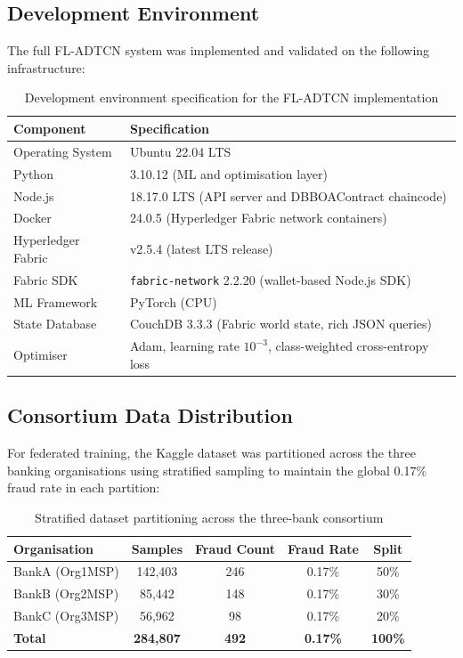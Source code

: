 \subsection*{Development Environment}

The full FL-ADTCN system was implemented and validated on the following infrastructure:

\begin{table}[H]
\centering
\caption{Development environment specification for the FL-ADTCN implementation}
\label{tab:dev_env}
\begin{tabular}{|p{4.0cm}|p{9.9cm}|}
\hline
\textbf{Component} & \textbf{Specification} \\ \hline
Operating System & Ubuntu 22.04 LTS \\ \hline
Python & 3.10.12 (ML and optimisation layer) \\ \hline
Node.js & 18.17.0 LTS (API server and DBBOAContract chaincode) \\ \hline
Docker & 24.0.5 (Hyperledger Fabric network containers) \\ \hline
Hyperledger Fabric & v2.5.4 (latest LTS release) \\ \hline
Fabric SDK & \texttt{fabric-network} 2.2.20 (wallet-based Node.js SDK) \\ \hline
ML Framework & PyTorch (CPU) \\ \hline
State Database & CouchDB 3.3.3 (Fabric world state, rich JSON queries) \\ \hline
Optimiser & Adam, learning rate $10^{-3}$, class-weighted cross-entropy loss \\ \hline
\end{tabular}
\end{table}

\subsection*{Consortium Data Distribution}

For federated training, the Kaggle dataset was partitioned across the three banking organisations using stratified sampling to maintain the global 0.17\% fraud rate in each partition:

\begin{table}[H]
\centering
\caption{Stratified dataset partitioning across the three-bank consortium}
\label{tab:consortium_split}
\begin{tabular}{|l|c|c|c|c|}
\hline
\textbf{Organisation} & \textbf{Samples} & \textbf{Fraud Count} & \textbf{Fraud Rate} & \textbf{Split} \\ \hline
BankA (Org1MSP) & 142,403 & 246 & 0.17\% & 50\% \\ \hline
BankB (Org2MSP) & 85,442 & 148 & 0.17\% & 30\% \\ \hline
BankC (Org3MSP) & 56,962 & 98 & 0.17\% & 20\% \\ \hline
\textbf{Total} & \textbf{284,807} & \textbf{492} & \textbf{0.17\%} & \textbf{100\%} \\ \hline
\end{tabular}
\end{table}

